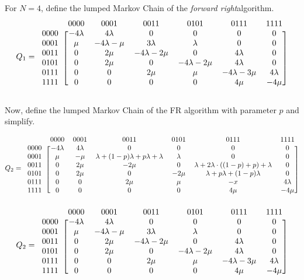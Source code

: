 \documentclass[10pt,a4paper]{article}
\newcommand{\FR}{\textit{forward right\xspace}}
\begin{document}
For $N=4$, define the lumped Markov Chain of the \FR algorithm.
\[ Q_1 =
  \begin{blockarray}{ccccccc}
    & 0000 & 0001 & 0011 & 0101 & 0111 & 1111 \\
    \begin{block}{c[cccccc]}
    0000 & -4\lambda & 4\lambda & 0 & 0 & 0 & 0 \\
    0001 & \mu & -4\lambda-\mu & 3\lambda & \lambda & 0 & 0 \\
    0011 & 0 & 2\mu & -4\lambda-2\mu & 0 & 4\lambda & 0 \\
    0101 & 0 & 2\mu & 0 & -4\lambda-2\mu & 4\lambda & 0  \\
    0111 & 0 & 0 & 2\mu & \mu & -4\lambda-3\mu & 4\lambda \\
    1111 & 0 & 0 & 0 & 0 & 4\mu & -4\mu \\
    \end{block}
  \end{blockarray}
\]

Now, define the lumped Markov Chain of the FR algorithm with parameter $p$ and simplify.

\[ Q_2 =
  \begin{blockarray}{ccccccc}
    & 0000 & 0001 & 0011 & 0101 & 0111 & 1111 \\
    \begin{block}{c[cccccc]}
    0000 & -4 \lambda & 4\lambda & 0 & 0 & 0 & 0 \\
    0001 & \mu & -\mu & \lambda + (1-p)\lambda+p\lambda+\lambda & \lambda & 0 & 0 \\
    0011 & 0 & 2\mu & -2\mu & 0 & \lambda+2\lambda \cdot ((1-p)+p)+\lambda & 0 \\
    0101 & 0 & 2\mu & 0 & -2\mu & \lambda+p\lambda+(1-p)\lambda & 0  \\
    0111 & 0 & 0 & 2\mu & \mu & -x & 4\lambda \\
    1111 & 0 & 0 & 0 & 0 & 4\mu & -4\mu \\
    \end{block}
  \end{blockarray}
\]
\[ Q_2 =
  \begin{blockarray}{ccccccc}
    & 0000 & 0001 & 0011 & 0101 & 0111 & 1111 \\
    \begin{block}{c[cccccc]}
    0000 & -4\lambda & 4\lambda & 0 & 0 & 0 & 0 \\
    0001 & \mu & -4\lambda-\mu & 3\lambda & \lambda & 0 & 0 \\
    0011 & 0 & 2\mu & -4\lambda-2\mu & 0 & 4\lambda & 0 \\
    0101 & 0 & 2\mu & 0 & -4\lambda-2\mu & 4\lambda & 0  \\
    0111 & 0 & 0 & 2\mu & \mu & -4\lambda-3\mu & 4\lambda \\
    1111 & 0 & 0 & 0 & 0 & 4\mu & -4\mu \\
    \end{block}
  \end{blockarray}
\]
\end{document}
